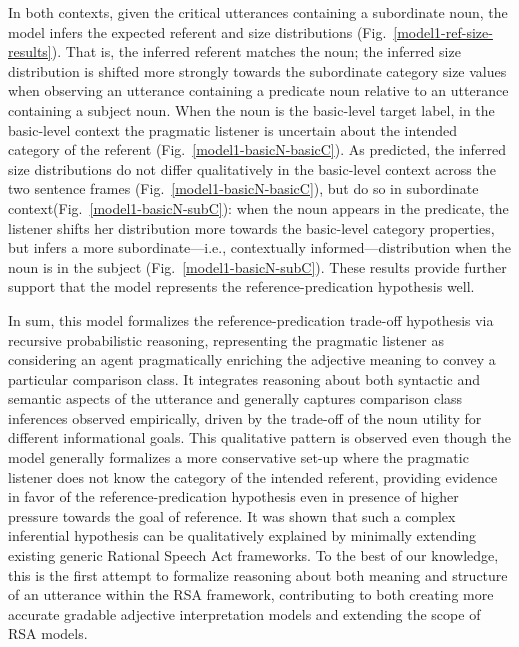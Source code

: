 In both contexts, given the critical utterances containing a subordinate noun, the model infers the expected referent and size distributions (Fig.~\ref{model1-ref-size-results}). That is, the inferred referent matches the noun; the inferred size distribution is shifted more strongly towards the subordinate category size values when observing an utterance containing a predicate noun relative to an utterance containing a subject noun. 
When the noun is the basic-level target label, in the basic-level context the pragmatic listener is uncertain about the intended category of the referent (Fig.~\ref{model1-basicN-basicC}). As predicted, the inferred size distributions do not differ qualitatively in the basic-level context across the two sentence frames (Fig.~\ref{model1-basicN-basicC}), but do so in subordinate context(Fig.~\ref{model1-basicN-subC}): when the noun appears in the predicate, the listener shifts her distribution more towards the basic-level category properties, but infers a more subordinate---i.e., contextually informed---distribution when the noun is in the subject (Fig.~\ref{model1-basicN-subC}). These results provide further support that the model represents the reference-predication hypothesis well.

In sum, this model formalizes the reference-predication trade-off hypothesis via recursive probabilistic reasoning, representing the pragmatic listener as considering an agent pragmatically enriching the adjective meaning to convey a particular comparison class. It integrates reasoning about both syntactic and semantic aspects of the utterance and generally captures comparison class inferences observed empirically, driven by the trade-off of the noun utility for different informational goals. This qualitative pattern is observed even though the model generally formalizes a more conservative set-up where the pragmatic listener does not know the category of the intended referent, providing evidence in favor of the reference-predication hypothesis even in presence of higher pressure towards the goal of reference. It was shown that such a complex inferential hypothesis can be qualitatively explained by minimally extending existing generic Rational Speech Act frameworks. To the best of our knowledge, this is the first attempt to formalize reasoning about both meaning and structure of an utterance within the RSA framework,  contributing to both creating more accurate gradable adjective interpretation models and extending the scope of RSA models. 
